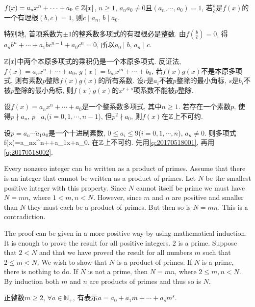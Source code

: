 $f(x)=a_nx^n+\cdots+a_0\in\Bbb Z[x]$, $n\ge1$, $a_na_0\ne0$且$(a_n,\cdots, a_0)=1$, 若$\frac{b}{c}$是$f(x)$的一个有理根$(b,c)=1$, 
则$c\mid a_n$, $b\mid a_0$.

特别地, 首项系数为$\pm 1$的整系数多项式的有理根必是整数.
\et
\ba
由$f\left(\frac{b}{c}\right)=0$, 得$a_nb^n+\cdots+a_1bc^{n-1}+a_0c^n=0$, 所以$a_0\mid b$, $a_n\mid c$.

{\color{red}{一种证明有理数是整数的证明途径: 证复数是整数, 先证其是有理数, 且找到作为零点的首一多项式.}}
\ea

$\Bbb Z[x]$中两个本原多项式的乘积仍是一个本原多项式.
\et
\ba
反证法, $f(x)=a_nx^n+\cdots+a_0$, $g(x)=b_mx^m+\cdots+b_0$, 若$f(x)g(x)$不是本原多项式, 则有素数$p$整除$f(x)g(x)$的所有系数.
设$r$是$a_i$不被$p$整除的最小角标, $s$是$b_i$不被$p$整除的最小角标, 则$f(x)g(x)$的$x^{r+s}$项系数不能被$p$整除.
\ea

设$f(x)=a_nx^n+\cdots+a_0$是一个整系数多项式, 其中$n\ge1$. 若存在一个素数$p$, 使得$p\nmid a_n$, $p\mid a_i$($i=0,1,\cdots,n-1$), 
但$p^2\nmid a_0$, 则$f(x)$在$\Bbb Z$上不可约.
\et

设$p=\overline{a_n\cdots a_1a_0}$是一个十进制素数, $0\le a_i\le9$($i=0,1,\cdots, n$), $a_n\ne0$. 则多项式
\bee
f(x)=a_nx^n+\cdots+a_1x+a_0.
\eee
在$\Bbb Z$上不可约.
\et
\ba
先用\ref{q:20170518001}, 再用\ref{q:20170518002}.
\ea

\bt{}{}
Every nonzero integer can be written as a product of primes.
\et
\ba
Assume that there is an integer that cannot be written as a product of primes.
Let $N$ be the smallest positive integer with this property. Since $N$ cannot itself be prime we must have
$N=mn$, where $1<m, n<N$. However, since $m$ and $n$ are positive and smaller than $N$ they must each be a product
of primes. But then so is $N=mn$. This is a contradiction.

The proof can be given in a more positive way by using mathematical induction.
It is enough to prove the result for all positive integers. $2$ is a prime.
Suppose that $2<N$ and that we have proved the result for all numbers $m$ such that $2\le m<N$. 
We wish to show that $N$ is a product of primes. 
If $N$ is a prime, there is nothing to do. 
If $N$ is not a prime, then $N=mn$, where $2\le m, n<N$. 
By induction both $m$ and $n$ are products of primes and thus so is $N$.
\ea

正整数$m\ge2$, $\forall a\in\mathbb{N}_{+}$, 有表示$a=a_0+a_1m+\cdots+a_sm^s$.
\et

